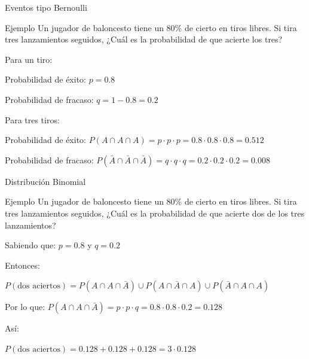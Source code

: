 \documentclass{beamer}
\begin{document}
\begin{frame}{Eventos tipo Bernoulli}

  \begin{block}{Ejemplo}
    Un jugador de baloncesto tiene un 80\% de cierto en tiros libres. Si tira tres
    lanzamientos seguidos, ¿Cuál es la probabilidad de que acierte los tres?
  \end{block}

  \begin{block}{}
    Para un tiro:

    Probabilidad de éxito: $p=0.8$

    Probabilidad de fracaso: $q = 1 - 0.8 = 0.2$
  \end{block}

  \begin{block}{}
    Para tres tiros:

    Probabilidad de éxito: $P(A \cap A \cap A) = p \cdot p \cdot p = 0.8 \cdot 0.8
    \cdot 0.8 = 0.512$

  \end{block}

  \begin{block}{}

    Probabilidad de fracaso: $P(\bar{A} \cap \bar{A} \cap \bar{A}) = q \cdot q \cdot q = 0.2 \cdot 0.2
    \cdot 0.2 = 0.008$

  \end{block}

\end{frame}

\begin{frame}{Distribución Binomial}
  \begin{block}{Ejemplo}
    Un jugador de baloncesto tiene un 80\% de cierto en tiros libres. Si tira tres
    lanzamientos seguidos, ¿Cuál es la probabilidad de que acierte dos de los tres
    lanzamientos?
  \end{block}

  \begin{block}{}
    Sabiendo que:    $p = 0.8$ y  $q = 0.2$

    Entonces:

$P(\text{dos aciertos}) = P(A \cap A \cap \bar{A}) 
                          \cup P(A \cap \bar{A} \cap A)
                          \cup P(\bar{A} \cap A \cap A )$
  \end{block}

  \begin{block}{}  
    Por lo que:
    $P(A \cap A \cap \bar{A}) = p \cdot p \cdot q 
                              = 0.8 \cdot 0.8 \cdot 0.2 
                              = 0.128$
  \end{block}

  \begin{block}{}
    Así:
    
    $P(\text{dos aciertos}) = 0.128 + 0.128 + 0.128 = 3 \cdot 0.128$
  \end{block}
\end{frame}
\end{document}
